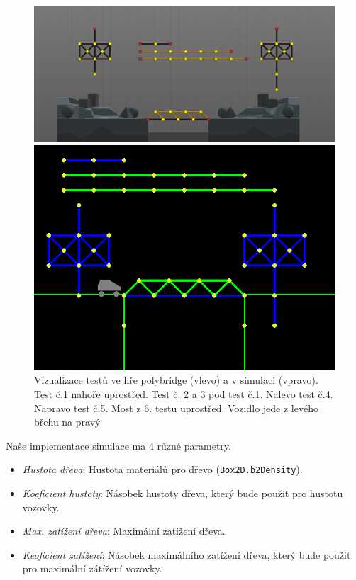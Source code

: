 \begin{figure}[ht]
    \centering
    \begin{minipage}{0.49\textwidth}
        \centering
        \includegraphics[width=\linewidth]{img/poly_tests.png}
    \end{minipage}\hfill
    \begin{minipage}{0.49\textwidth}
        \centering
        \includegraphics[width=\linewidth]{img/sim_tests.png}
    \end{minipage}
    \caption{Vizualizace testů ve hře polybridge (vlevo) a v simulaci (vpravo). Test č.1 nahoře uprostřed. Test č. 2 a 3 pod test č.1. Nalevo test č.4. Napravo test č.5. Most z 6. testu uprostřed. Vozidlo jede z levého břehu na pravý}
    \label{impl-fig:1}
\end{figure}

Naše implementace simulace ma $4$ různé parametry.
\begin{itemize}
    \item \emph{Hustota dřeva}: Hustota materiálů pro dřevo (\texttt{Box2D.b2Density}).
    \item \emph{Koeficient hustoty}: Násobek hustoty dřeva, který bude použit pro hustotu vozovky.
    \item \emph{Max. zatížení dřeva}: Maximální zatížení dřeva.
    \item \emph{Keoficient zatížení}: Násobek maximálního zatížení dřeva, který bude použit pro maximální zátížení vozovky.
\end{itemize}

